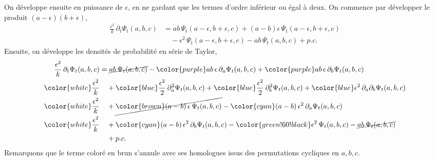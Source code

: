 \documentclass[openany,a4paper,12pt]{article}
\begin{document}
\par On développe ensuite en puissance de $\epsilon$, en ne gardant que les termes d'ordre inférieur ou égal à deux. On commence par développer le produit $(a-\epsilon)(b+\epsilon)$,
%
\begin{equation}\label{moyal_dev_epsilon_produit}
\begin{split}
	\frac{\epsilon^2}{k}\, \partial_t \Psi_t(a,b,c) 
	&= ab \, \Psi_t(a-\epsilon, b+\epsilon, c) + (a-b)\epsilon \, \Psi_t(a-\epsilon, b+\epsilon, c) \\
	&\quad - \epsilon^2 \, \Psi_t(a-\epsilon, b+\epsilon, c) - ab \, \Psi_t(a, b, c) + p.c.
\end{split}
\end{equation}
%
Ensuite, on développe les densités de probabilité en série de Taylor,
%
\begin{equation}\label{moyal_dev_epsilon_taylor}
\begin{split}
	\frac{\epsilon^2}{k}\, \partial_t \Psi_t(a,b,c) 
	&= \cancel{ab \, \Psi_t(a, b, c)} 
	- {\color{purple} ab \, \epsilon \, \partial_a \Psi_t(a,b,c) }
	+ {\color{purple} ab \, \epsilon \, \partial_b \Psi_t(a,b,c) }\\
	{\color{white} \frac{\epsilon^2}{k} } %
	&\quad + {\color{blue} \frac{\epsilon^2}{2} \, \partial_a^2 \Psi_t(a,b,c) }
	+ {\color{blue} \frac{\epsilon^2}{2} \, \partial_b^2 \Psi_t(a,b,c) }
	+ {\color{blue} \epsilon^2 \, \partial_a \partial_b \Psi_t(a,b,c) }\\
	{\color{white} \frac{\epsilon^2}{k} } %
	&\quad + \cancel{\color{brown} (a-b) \,\epsilon \, \Psi_t(a, b, c) }
	- {\color{cyan} (a-b) \,\epsilon^2 \, \partial_a \Psi_t(a,b,c) }\\
	{\color{white} \frac{\epsilon^2}{k} } %
	&\quad + {\color{cyan} (a-b) \,\epsilon^2 \, \partial_b \Psi_t(a,b,c) } 
	- {\color{green!60!black} \epsilon^2 \, \Psi_t(a, b, c) } 
	- \cancel{ab \, \Psi_t(a, b, c)} \\
	&\quad + p.c.
\end{split}
\end{equation}
%
Remarquons que le terme coloré en brun s'annule avec ses homologues issus des permutations cycliques en $a,b,c$. 
\end{document}
